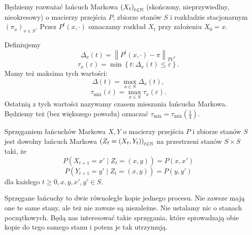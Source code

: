     Będziemy rozważać łańcuch Markowa $\left( X_t \right) _{t \in \mathbb{N}}$ (skończony, nieprzywiedlny, nieokresowy) o macierzy przejścia $P$, zbiorze stanów $S$ i rozkładzie stacjonarnym $\left( \pi_x \right) _{x \in S}$. Przez $P^{t}\left( x, \cdot \right) $ oznaczamy rozkład $X_t$ przy założeniu $X_0 = x $.

    \begin{definition}
    Definiujemy $$ \Delta_x\left( t  \right) = \left\|P^{t}\left( x, \cdot  \right) - \pi\right\|_{TV}, $$ $$ \tau_x\left( \varepsilon  \right) = \min \left\{ t : \Delta_x\left( t  \right) \le \varepsilon  \right\} . $$ 
    Mamy też maksima tych wartości:
    $$ \Delta\left( t  \right) = \max_{x \in S} \Delta_x\left( t  \right) , $$ 
    $$ \tau_{\mathrm{mix}}\left( \varepsilon  \right) = \max_{x \in S} \tau_x\left( \varepsilon  \right) . $$ 
    Ostatnią z tych wartości nazywamy czasem mieszania łańcucha Markowa. Będziemy też (bez większego powodu) oznaczać $\tau_{\mathrm{mix}} = \tau_{\mathrm{mix}}\left( \frac{1}{4} \right) $.
\end{definition}

\begin{definition}
    Sprzęganiem łańcuchów Markowa $X,Y$ o macierzy przejścia $P$ i zbiorze stanów $S$ jest dowolny łańcuch Markowa $\left( Z_t = \left( X_t, Y_t \right)  \right) _{t \in \mathbb{N}}$ na przestrzeni stanów $S \times S$ taki, że
    $$ P\left( X_{t+1} = x' \mid Z_t = \left( x,y \right)  \right) = P\left( x,x' \right)  $$ 
    $$ P\left( Y_{t+1} = y' \mid Z_t = \left( x,y \right)  \right) = P\left( y, y' \right)  $$ 
    dla każdego $t\ge 0, x,y,x',y' \in S$.

    Sprzęgane łańcuchy to dwie równoległe kopie jednego procesu. Nie zawsze mają one te same stany, ale też nie zawsze są niezależne. Nie ustalamy nic o stanach początkowych. Będą nas interesować takie sprzęgania, które sprowadzają obie kopie do tego samego stanu i potem je tak utrzymują.
\end{definition}

